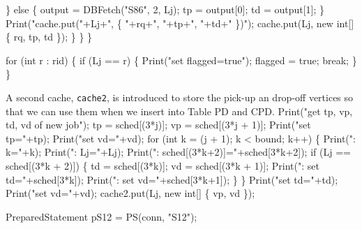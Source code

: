 \documentclass{article}
\def\nwendcode{\endtrivlist \endgroup}      %
\let\nwdocspar=\par
\theoremstyle{definition}                   %
\begin{document}
      \} else \{
        output = DBFetch("S86", 2, Lj);
        tp = output[0];
        td = output[1];
      \}
      Print("cache.put("+Lj+", \{ "+rq+", "+tp+", "+td+" \})");
      cache.put(Lj, new int[] \{ rq, tp, td \});
    \}
  \}
\}
\nwendcode{}\nwdocspar
\nwenddocs{}\endmoddef{}
for (int r : rid) \{
  if (Lj == r) \{
    Print("set flagged=true");
    flagged = true;
    break;
  \}
\}
\nwendcode{}\nwdocspar
A second cache, {\tt{}cache2}, is introduced to store the pick-up an drop-off
vertices so that we can use them when we insert into Table PD and CPD.
\nwenddocs{}\endmoddef{}
Print("get tp, vp, td, vd of new job");
tp = sched[(3*j)];
vp = sched[(3*j + 1)];
Print("set tp="+tp);
Print("set vd="+vd);
for (int k = (j + 1); k < bound; k++) \{
  Print(": k="+k);
  Print(":   Lj="+Lj);
  Print(":   sched[(3*k+2)]="+sched[3*k+2]);
  if (Lj == sched[(3*k + 2)]) \{
    td = sched[(3*k)];
    vd = sched[(3*k + 1)];
    Print(":   set td="+sched[3*k]);
    Print(":   set vd="+sched[3*k+1]);
  \}
\}
Print("set td="+td);
Print("set vd="+vd);
cache2.put(Lj, new int[] \{ vp, vd \});
\nwendcode{}\nwdocspar
\nwenddocs{}\endmoddef{}
PreparedStatement pS12 = PS(conn, "S12");
\end{document}
